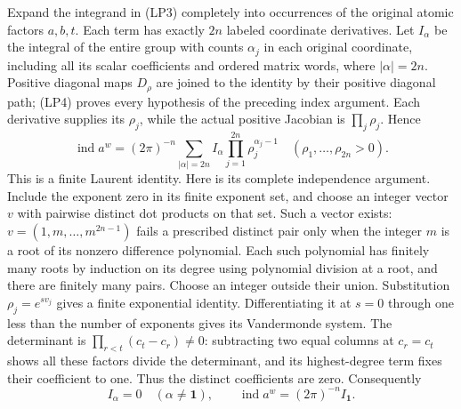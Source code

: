 \documentclass[
  11pt,
]{article}
\begin{document}
Expand the integrand in (LP3) completely into occurrences of the
original atomic factors \(a,b,t\). Each term has exactly \(2n\) labeled
coordinate derivatives. Let \(I_\alpha\) be the integral of the entire
group with counts \(\alpha_j\) in each original coordinate, including
all its scalar coefficients and ordered matrix words, where
\(|\alpha|=2n\). Positive diagonal maps \(D_\rho\) are joined to the
identity by their positive diagonal path; (LP4) proves every hypothesis
of the preceding index argument. Each derivative supplies its
\(\rho_j\), while the actual positive Jacobian is \(\prod_j\rho_j\).
Hence \[
 \operatorname{ind}a^w=(2\pi)^{-n}
   \sum_{|\alpha|=2n}I_\alpha
               \prod_{j=1}^{2n}\rho_j^{\alpha_j-1}
       \quad(\rho_1,\ldots,\rho_{2n}>0).
 \tag{LP5}
\] This is a finite Laurent identity. Here is its complete independence
argument. Include the exponent zero in its finite exponent set, and
choose an integer vector \(v\) with pairwise distinct dot products on
that set. Such a vector exists: \(v=(1,m,\ldots,m^{2n-1})\) fails a
prescribed distinct pair only when the integer \(m\) is a root of its
nonzero difference polynomial. Each such polynomial has finitely many
roots by induction on its degree using polynomial division at a root,
and there are finitely many pairs. Choose an integer outside their
union. Substitution \(\rho_j=e^{s v_j}\) gives a finite exponential
identity. Differentiating it at \(s=0\) through one less than the number
of exponents gives its Vandermonde system. The determinant is
\(\prod_{r<t}(c_t-c_r)\ne0\): subtracting two equal columns at
\(c_r=c_t\) shows all these factors divide the determinant, and its
highest-degree term fixes their coefficient to one. Thus the distinct
coefficients are zero. Consequently \[
 I_\alpha=0\quad(\alpha\ne\mathbf1),\qquad
 \operatorname{ind}a^w=(2\pi)^{-n}I_{\mathbf1}.
 \tag{LP6}
\]
\end{document}
